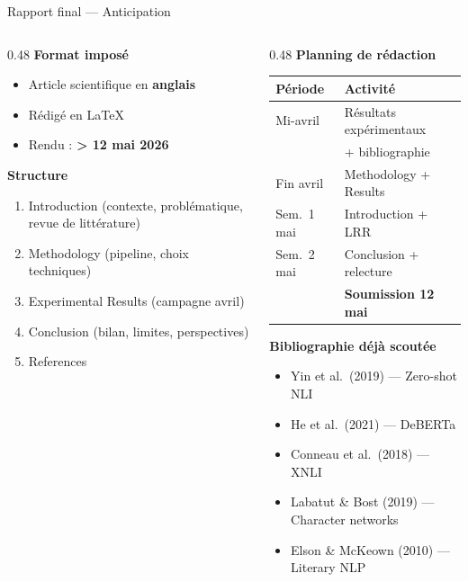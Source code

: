 \documentclass[aspectratio=169]{beamer}
\begin{document}
\begin{frame}{Rapport final --- Anticipation}
  \begin{columns}[T]
    \begin{column}{0.48\textwidth}
      \textbf{Format imposé}
      \begin{itemize}
        \item Article scientifique en \textbf{anglais}
        \item Rédigé en \LaTeX
        \item Rendu : \textbf{> 12 mai 2026}
      \end{itemize}
      \vspace{6pt}
      \textbf{Structure}
      \begin{enumerate}
        \item Introduction (contexte, problématique, revue de littérature)
        \item Methodology (pipeline, choix techniques)
        \item Experimental Results (campagne avril)
        \item Conclusion (bilan, limites, perspectives)
        \item References
      \end{enumerate}
    \end{column}
    \begin{column}{0.48\textwidth}
      \textbf{Planning de rédaction}\\[4pt]
      \footnotesize
      \setlength{\tabcolsep}{3pt}
      \renewcommand{\arraystretch}{1.3}
      \begin{tabular}{ll}
        \toprule
        Période & Activité \\
        \midrule
        Mi-avril & Résultats expérimentaux \\
                 & + bibliographie \\
        Fin avril & Methodology + Results \\
        Sem.\ 1 mai & Introduction + LRR \\
        Sem.\ 2 mai & Conclusion + relecture \\
                    & \textbf{Soumission 12 mai} \\
        \bottomrule
      \end{tabular}
      \vspace{6pt}

      \textbf{Bibliographie déjà scoutée}\\[2pt]
      \begin{itemize}\scriptsize
        \item Yin et al.\ (2019) --- Zero-shot NLI
        \item He et al.\ (2021) --- DeBERTa
        \item Conneau et al.\ (2018) --- XNLI
        \item Labatut \& Bost (2019) --- Character networks
        \item Elson \& McKeown (2010) --- Literary NLP
      \end{itemize}
    \end{column}
  \end{columns}
\end{frame}
\end{document}
